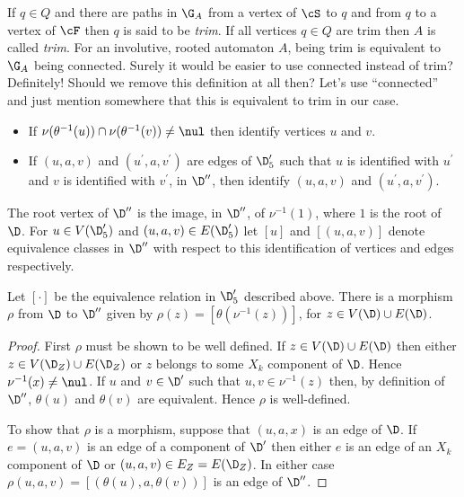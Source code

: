 If $q\in Q$ and there are paths in $\G_A$ from a vertex of $\cS$ to $q$
and from $q$ to a vertex of $\cF$ then $q$ is said to be \emph{trim}.
If all vertices $q\in Q$ are trim then $A$ is called \emph{trim}.
 {\ajd For an involutive, rooted automaton $A$, being trim is equivalent
to $\G_A$ being connected. Surely it would be easier to use
connected instead of trim?}
 {\ef Definitely! Should we remove this definition at all then?}
{\ajd Let's use ``connected'' and just mention somewhere that this
is equivalent to trim in our case.}


\begin{itemize}
\item If $\nu(\theta^{-1}(u))\cap \nu(\theta^{-1}(v))\neq \nul$ then
identify vertices $u$ and $v$.
\item If $(u,a,v)$ and $(u^\prime, a, v^\prime)$ are edges
of $\D^\prime_5$ such that $u$ is identified with $u^\prime$ and
$v$ is identified with $v^\prime$, in $\D^{\prime\prime}$, then
identify  $(u,a,v)$ and $(u^\prime, a, v^\prime)$.
\end{itemize}
The root vertex of $\D^{\prime\prime}$ is the image, in
$\D^{\prime\prime}$, of $\nu^{-1}(1)$, where $1$ is  the root of
$\D$.
For $u \in V(\D^\prime_5)$ and $(u,a,v) \in E(\D^\prime_5)$ let
$[u]$ and $[(u,a,v)]$ denote equivalence classes in
$\D^{\prime\prime}$ with respect to this identification of
vertices and edges respectively.

\begin{lemma}\label{lem:resol-quot}
Let $[\cdot]$ be the equivalence relation in $\D^\prime_5$
described above. There is a morphism $\rho$ from  $\D$ to
$\D^{\prime\prime}$ given by $\rho(z)=[\theta(\nu^{-1}(z))]$, for
$z\in V(\D)\cup E(\D)$.
\end{lemma}
\begin{proof}
First $\rho$ must be shown to be well defined. If $z \in V(\D)\cup
E(\D)$ then either $z\in V(\D_Z)\cup E(\D_Z)$ or $z$ belongs to
some $X_k$ component of $\D$. Hence
 $\nu^{-1}(x)\neq \nul$. If $u$ and $v\in \D^\prime$ such that $u, v \in \nu^{-1}(z)$ then, by definition of
$\D^{\prime\prime}$, $\theta(u)$ and $\theta(v)$ are equivalent.
Hence $\rho$ is well-defined.

To show that $\rho$ is a morphism, suppose that $(u,a,x)$ is an edge
of $\D$. If $e=(u,a,v)$ is an edge of a component of $\D^\prime$ then
either $e$ is an edge of an $X_k$ component of $\D$ or
 $(u,a,v)\in E_Z=E(\D_Z)$. In either  case
$\rho(u,a,v)=[(\theta(u),a,\theta(v))]$ is an edge of $\D^{\prime\prime}$.
\end{proof}



